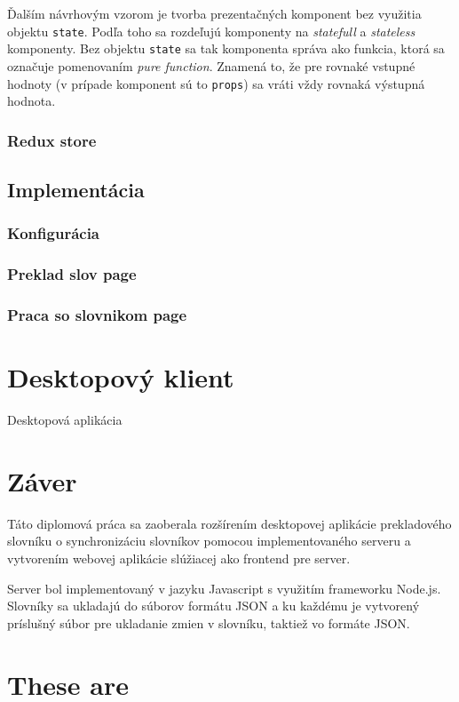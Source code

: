 \documentclass[
  digital, %
  table,   %
  lof,     %
  lot,     %
]{fithesis3}
\begin{document}
Ďalším návrhovým vzorom je tvorba prezentačných komponent bez využitia objektu \texttt{state}. Podľa toho sa rozdeľujú komponenty na \textit{statefull} a \textit{stateless} komponenty. Bez objektu \texttt{state} sa tak komponenta správa ako funkcia, ktorá sa označuje pomenovaním \textit{pure function}. Znamená to, že pre rovnaké vstupné hodnoty (v prípade komponent sú to \texttt{props}) sa vráti vždy rovnaká výstupná hodnota.

\subsection{Redux store}

\section{Implementácia}
\subsection{Konfigurácia}
\subsection{Preklad slov page}
\subsection{Praca so slovnikom page}

\chapter{Desktopový klient}

Desktopová aplikácia

\chapter{Záver}
Táto diplomová práca sa zaoberala rozšírením desktopovej aplikácie prekladového slovníku o synchronizáciu slovníkov pomocou implementovaného serveru a vytvorením webovej aplikácie slúžiacej ako frontend pre server.

Server bol implementovaný v jazyku Javascript s využitím frameworku Node.js. Slovníky sa ukladajú do súborov formátu JSON a ku každému je vytvorený príslušný súbor pre ukladanie zmien v slovníku, taktiež vo formáte JSON. 

\chapter{These are}
\end{document}
